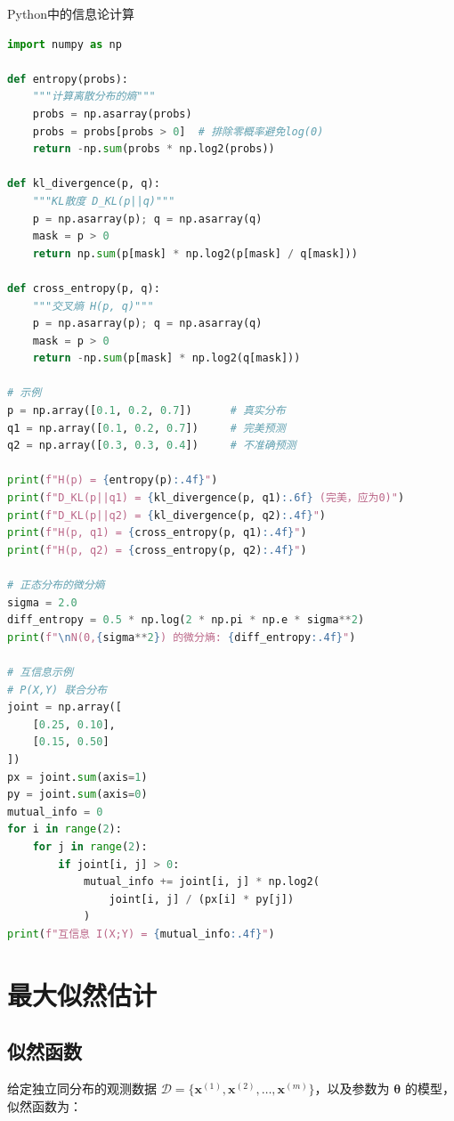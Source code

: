 \begin{mycode}{Python中的信息论计算}
\begin{lstlisting}[language=Python]
import numpy as np

def entropy(probs):
    """计算离散分布的熵"""
    probs = np.asarray(probs)
    probs = probs[probs > 0]  # 排除零概率避免log(0)
    return -np.sum(probs * np.log2(probs))

def kl_divergence(p, q):
    """KL散度 D_KL(p||q)"""
    p = np.asarray(p); q = np.asarray(q)
    mask = p > 0
    return np.sum(p[mask] * np.log2(p[mask] / q[mask]))

def cross_entropy(p, q):
    """交叉熵 H(p, q)"""
    p = np.asarray(p); q = np.asarray(q)
    mask = p > 0
    return -np.sum(p[mask] * np.log2(q[mask]))

# 示例
p = np.array([0.1, 0.2, 0.7])      # 真实分布
q1 = np.array([0.1, 0.2, 0.7])     # 完美预测
q2 = np.array([0.3, 0.3, 0.4])     # 不准确预测

print(f"H(p) = {entropy(p):.4f}")
print(f"D_KL(p||q1) = {kl_divergence(p, q1):.6f} (完美，应为0)")
print(f"D_KL(p||q2) = {kl_divergence(p, q2):.4f}")
print(f"H(p, q1) = {cross_entropy(p, q1):.4f}")
print(f"H(p, q2) = {cross_entropy(p, q2):.4f}")

# 正态分布的微分熵
sigma = 2.0
diff_entropy = 0.5 * np.log(2 * np.pi * np.e * sigma**2)
print(f"\nN(0,{sigma**2}) 的微分熵: {diff_entropy:.4f}")

# 互信息示例
# P(X,Y) 联合分布
joint = np.array([
    [0.25, 0.10],
    [0.15, 0.50]
])
px = joint.sum(axis=1)
py = joint.sum(axis=0)
mutual_info = 0
for i in range(2):
    for j in range(2):
        if joint[i, j] > 0:
            mutual_info += joint[i, j] * np.log2(
                joint[i, j] / (px[i] * py[j])
            )
print(f"互信息 I(X;Y) = {mutual_info:.4f}")
\end{lstlisting}
\end{mycode}

\section{最大似然估计}

\subsection{似然函数}

给定独立同分布的观测数据 $\mathcal{D}=\{\mathbf{x}^{(1)},\mathbf{x}^{(2)},\ldots,\mathbf{x}^{(m)}\}$，以及参数为 $\boldsymbol{\theta}$ 的模型，似然函数为：

